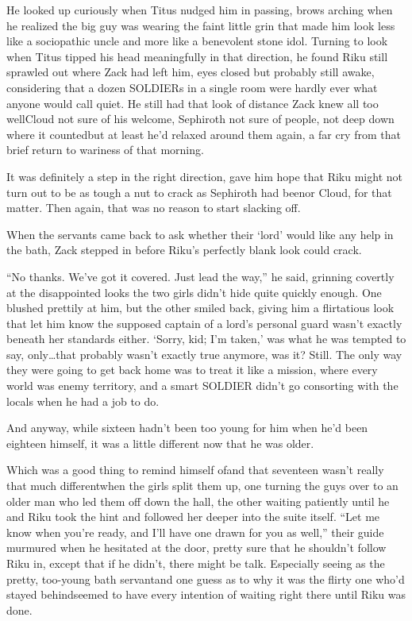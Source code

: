 He looked up curiously when Titus nudged him in passing, brows arching when he realized the big guy was wearing the faint little grin that made him look less like a sociopathic uncle and more like a benevolent stone idol. Turning to look when Titus tipped his head meaningfully in that direction, he found Riku still sprawled out where Zack had left him, eyes closed but probably still awake, considering that a dozen SOLDIERs in a single room were hardly ever what anyone would call quiet. He still had that look of distance Zack knew all too well\textemdash Cloud not sure of his welcome, Sephiroth not sure of people, not deep down where it counted\textemdash but at least he'd relaxed around them again, a far cry from that brief return to wariness of that morning.

It was definitely a step in the right direction, gave him hope that Riku might not turn out to be as tough a nut to crack as Sephiroth had been\textemdash or Cloud, for that matter. Then again, that was no reason to start slacking off.

When the servants came back to ask whether their `lord' would like any help in the bath, Zack stepped in before Riku's perfectly blank look could crack.

``No thanks. We've got it covered. Just lead the way,'' he said, grinning covertly at the disappointed looks the two girls didn't hide quite quickly enough. One blushed prettily at him, but the other smiled back, giving him a flirtatious look that let him know the supposed captain of a lord's personal guard wasn't exactly beneath her standards either. `Sorry, kid; I'm taken,' was what he was tempted to say, only\ldots that probably wasn't exactly true anymore, was it? Still. The only way they were going to get back home was to treat it like a mission, where every world was enemy territory, and a smart SOLDIER didn't go consorting with the locals when he had a job to do.

And anyway, while sixteen hadn't been too young for him when he'd been eighteen himself, it was a little different now that he was older.

Which was a good thing to remind himself of\textemdash and that seventeen wasn't really that much different\textemdash when the girls split them up, one turning the guys over to an older man who led them off down the hall, the other waiting patiently until he and Riku took the hint and followed her deeper into the suite itself. ``Let me know when you're ready, and I'll have one drawn for you as well,'' their guide murmured when he hesitated at the door, pretty sure that he shouldn't follow Riku in, except that if he didn't, there might be talk. Especially seeing as the pretty, too-young bath servant\textemdash and one guess as to why it was the flirty one who'd stayed behind\textemdash seemed to have every intention of waiting right there until Riku was done.

